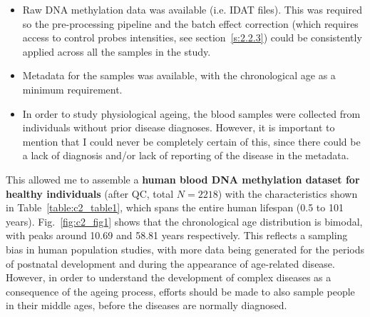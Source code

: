 \begin{itemize}
	
	\item Raw DNA methylation data was available (i.e. IDAT files). This was required so the pre-processing pipeline and the batch effect correction (which requires access to control probes intensities, see section~\ref{s:2.2.3}) could be consistently applied across all the samples in the study.
	
	\item Metadata for the samples was available, with the chronological age as a minimum requirement. 
	
	\item In order to study physiological ageing, the blood samples were collected from individuals without prior disease diagnoses. However, it is important to mention that I could never be completely certain of this, since there could be a lack of diagnosis and/or lack of reporting of the disease in the metadata. 
	
\end{itemize}

\smallskip

This allowed me to assemble a \textbf{human blood DNA methylation dataset for healthy individuals} (after \acrshort{QC}, total $N=2218$) with the characteristics shown in Table~\ref{table:c2_table1}, which spans the entire human lifespan (0.5 to 101 years). Fig.~\ref{fig:c2_fig1} shows that the chronological age distribution is bimodal, with peaks around 10.69 and 58.81 years respectively. This reflects a sampling bias in human population studies, with more data being generated for the periods of postnatal development and during the appearance of age-related disease. However, in order to understand the development of complex diseases as a consequence of the ageing process, efforts should be made to also sample people in their middle ages, before the diseases are normally diagnosed.   


